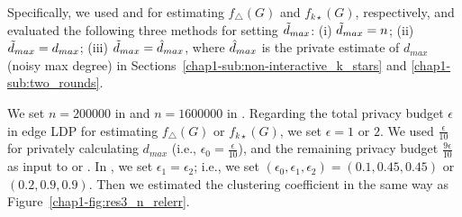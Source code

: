 Specifically, we used  and  for estimating $f_\triangle(G)$ and $f_{k\star}(G)$, respectively, and evaluated the following three methods for setting $\tilde{d}_{max}$: 
(i) 
$\tilde{d}_{max} = n$; 
(ii) 
$\tilde{d}_{max} = d_{max}$; 
(iii) 
$\tilde{d}_{max} = \hat{d}_{max}$, where $\hat{d}_{max}$ is the private estimate of $d_{max}$ 
(noisy max degree) in Sections~\ref{chap1-sub:non-interactive_k_stars} and \ref{chap1-sub:two_rounds}. 

We set $n=200000$ in \IMDB{} and $n=1600000$ in \Orkut{}. 
Regarding the total privacy budget $\epsilon$ in edge LDP for estimating $f_\triangle(G)$ or $f_{k\star}(G)$, we set $\epsilon=1$ or $2$. 
We used $\frac{\epsilon}{10}$ for privately calculating $d_{max}$ (i.e., $\epsilon_0 = \frac{\epsilon}{10}$), and the remaining privacy budget $\frac{9\epsilon}{10}$ as input to  or . 
In , we set $\epsilon_1 = \epsilon_2$; i.e., we set $(\epsilon_0, \epsilon_1, \epsilon_2) = (0.1, 0.45, 0.45)$ or $(0.2, 0.9, 0.9)$. 
Then we estimated the clustering coefficient in the same way as Figure~\ref{chap1-fig:res3_n_relerr}. 

